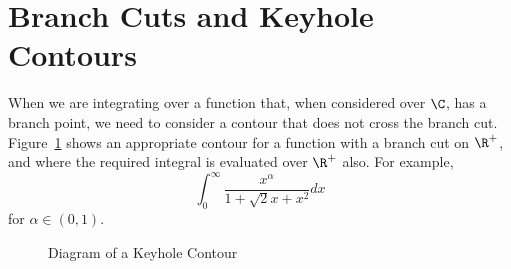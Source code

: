 \documentclass[../Main.tex]{subfiles}
\begin{document}
\section{Branch Cuts and Keyhole Contours}
When we are integrating over a function that, when considered over $\C$, has a branch point, we need to consider a contour that does not cross the branch cut. Figure~\ref{figKeyholeContour} shows an appropriate contour for a function with a branch cut on $\R^+$, and where the required integral is evaluated over $\R^+$ also. For example,
\begin{equation*}
    \int_{0}^{\infty} \frac{x^\alpha}{1 + \sqrt{2} x + x^2} dx
\end{equation*}
for $\alpha \in (0, 1)$.
\begin{figure}
    \centering
    \caption{Diagram of a Keyhole Contour}
    \label{figKeyholeContour}
\end{figure}
\end{document}
